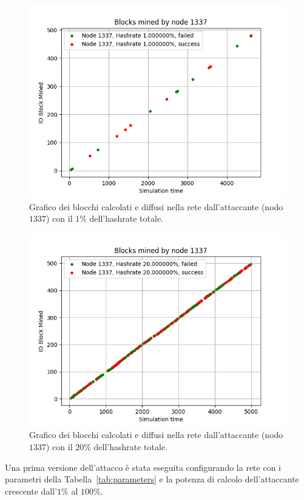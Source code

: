 \begin{figure}[H]
    \centering
    \includegraphics[width=\textwidth]{./images/1337-test-51-1.png}
    \caption{Grafico dei blocchi calcolati e diffusi nella rete dall'attaccante (nodo $1337$) con il $1\%$ dell'hashrate totale.}
    \label{fig:51v1.1}
\end{figure}
\begin{figure}[H]
    \centering
    \includegraphics[width=\textwidth]{./images/1337-test-51-20.png}
    \caption{Grafico dei blocchi calcolati e diffusi nella rete dall'attaccante (nodo $1337$) con il $20\%$ dell'hashrate totale.}
    \label{fig:51v1.20}
\end{figure}
Una prima versione dell'attacco è stata eseguita configurando la rete con i parametri della Tabella~\ref{tab:parameters} e la potenza di calcolo dell'attaccante crescente dall'$1\%$ al $100\%$.
